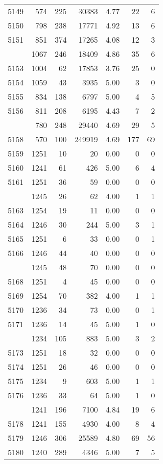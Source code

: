 \documentclass[
]{article}
\begin{document}
\begin{table}
\begin{tabular}[t]{lrrrrrr}
5149 & 574 & 225 & 30383 & 4.77 & 22 & 6\\
5150 & 798 & 238 & 17771 & 4.92 & 13 & 6\\
5151 & 851 & 374 & 17265 & 4.08 & 12 & 3\\
\addlinespace
5152 & 1067 & 246 & 18409 & 4.86 & 35 & 6\\
5153 & 1004 & 62 & 17853 & 3.76 & 25 & 0\\
5154 & 1059 & 43 & 3935 & 5.00 & 3 & 0\\
5155 & 834 & 138 & 6797 & 5.00 & 4 & 5\\
5156 & 811 & 208 & 6195 & 4.43 & 7 & 2\\
\addlinespace
5157 & 780 & 248 & 29440 & 4.69 & 29 & 5\\
5158 & 570 & 100 & 249919 & 4.69 & 177 & 69\\
5159 & 1251 & 10 & 20 & 0.00 & 0 & 0\\
5160 & 1241 & 61 & 426 & 5.00 & 6 & 4\\
5161 & 1251 & 36 & 59 & 0.00 & 0 & 0\\
\addlinespace
5162 & 1245 & 26 & 62 & 4.00 & 1 & 1\\
5163 & 1254 & 19 & 11 & 0.00 & 0 & 0\\
5164 & 1246 & 30 & 244 & 5.00 & 3 & 1\\
5165 & 1251 & 6 & 33 & 0.00 & 0 & 1\\
5166 & 1246 & 44 & 40 & 0.00 & 0 & 0\\
\addlinespace
5167 & 1245 & 48 & 70 & 0.00 & 0 & 0\\
5168 & 1251 & 4 & 45 & 0.00 & 0 & 0\\
5169 & 1254 & 70 & 382 & 4.00 & 1 & 1\\
5170 & 1236 & 34 & 73 & 0.00 & 0 & 1\\
5171 & 1236 & 14 & 45 & 5.00 & 1 & 0\\
\addlinespace
5172 & 1234 & 105 & 883 & 5.00 & 3 & 2\\
5173 & 1251 & 18 & 32 & 0.00 & 0 & 0\\
5174 & 1251 & 26 & 46 & 0.00 & 0 & 0\\
5175 & 1234 & 9 & 603 & 5.00 & 1 & 1\\
5176 & 1236 & 33 & 64 & 5.00 & 1 & 0\\
\addlinespace
5177 & 1241 & 196 & 7100 & 4.84 & 19 & 6\\
5178 & 1241 & 155 & 4930 & 4.00 & 8 & 4\\
5179 & 1246 & 306 & 25589 & 4.80 & 69 & 56\\
5180 & 1240 & 289 & 4346 & 5.00 & 7 & 5\\

\end{tabular}
\end{table}
\end{document}
